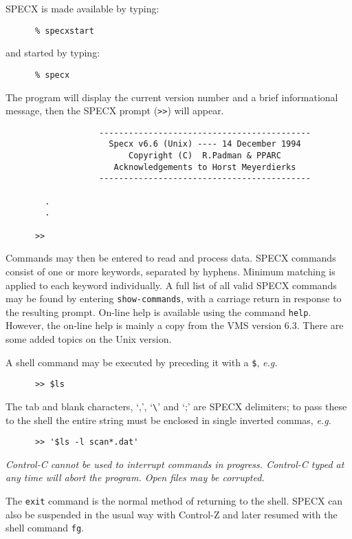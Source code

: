SPECX is made available by typing:
\begin{verbatim}
      % specxstart
\end{verbatim}
and started by typing:
\begin{verbatim}
      % specx 
\end{verbatim}
The program will display the current version number and
a brief informational message, then the SPECX prompt ({\tt>>}) will appear.

\begin{verbatim}
                   -------------------------------------------
                     Specx v6.6 (Unix) ---- 14 December 1994
                         Copyright (C)  R.Padman & PPARC
                      Acknowledgements to Horst Meyerdierks
                   -------------------------------------------

        .
        .

      >> 
\end{verbatim}

Commands may then be entered to read and process data.
SPECX commands consist of one or more keywords, separated
by hyphens. Minimum matching is applied to each keyword
individually. A full list of all valid SPECX commands
may be found by entering {\tt show-commands}, with a carriage return
in response to the resulting prompt. On-line help is available
using the command {\tt help}. However, the on-line help is mainly a copy
from the VMS version 6.3. There are some added topics on the Unix version.

A shell command may be executed by preceding it with a {\tt \$}, {\em e.g.}

\begin{verbatim}
      >> $ls
\end{verbatim}

The tab and blank characters, `,', `\verb+\+' and `;' are SPECX delimiters;
to pass these to the shell the entire string must be enclosed in single 
inverted commas, {\em e.g.}

\begin{verbatim}
      >> '$ls -l scan*.dat'
\end{verbatim}

{\em Control-C cannot be used to interrupt commands in progress.
Control-C typed at any time will abort the program. Open files may be
corrupted.}

The {\tt exit} command is the normal method of returning to the shell.
SPECX can also be suspended in the usual way with Control-Z and later
resumed with the shell command {\tt fg}.

